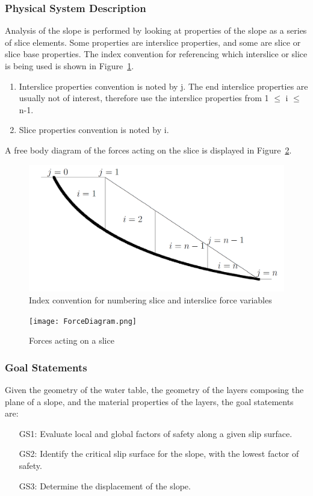 \documentclass[12pt]{article}
\begin{document}
\subsubsection{Physical System Description}
\label{Sec:PhysSystDesc}
Analysis of the slope is performed by looking at properties of the slope as a series of slice elements. Some properties are interslice properties, and some are slice or slice base properties. The index convention for referencing which interslice or slice is being used is shown in Figure~\ref{Figure:Indeconvfornumbslicandinteforcvari}.
\begin{enumerate}
\item{Interslice properties convention is noted by j. The end interslice properties are usually not of interest, therefore use the interslice properties from 1 $\leq{}$ i $\leq{}$ n-1.}
\item{Slice properties convention is noted by i.}
\end{enumerate}
A free body diagram of the forces acting on the slice is displayed in Figure~\ref{Figure:Forcactionaslic}.
\begin{figure}
\begin{center}
\includegraphics{IndexConvention.png}
\caption{Index convention for numbering slice and interslice force variables}
\label{Figure:Indeconvfornumbslicandinteforcvari}
\end{center}
\end{figure}
\begin{figure}
\begin{center}
\texttt{[image: ForceDiagram.png]}
\caption{Forces acting on a slice}
\label{Figure:Forcactionaslic}
\end{center}
\end{figure}
\subsubsection{Goal Statements}
\label{Sec:GoalStat}
Given the geometry of the water table, the geometry of the layers composing the plane of a slope, and the material properties of the layers, the goal statements are:
\begin{itemize}
\item[GS1:]Evaluate local and global factors of safety along a given slip surface.
\item[GS2:]Identify the critical slip surface for the slope, with the lowest factor of safety.
\item[GS3:]Determine the displacement of the slope.
\end{itemize}
\end{document}
